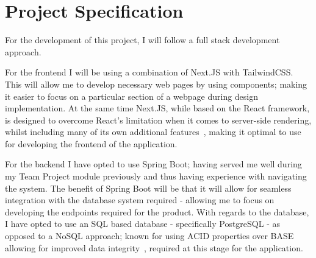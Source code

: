 \documentclass[]{final_report}
\begin{document}
\begin{abstract}
This can be achieved by adopting a points system similar to Picarats seen in the Professor Layton series~\cite{LAYTON} - where students will lose marks each time they fail to answer a question correctly until a set minimum. My intention with this system is that students are encouraged to try their hardest to answer correctly in their initial attempt, in order for them to score maximum marks - enabling their competitive spirit when comparing against others. This can be enhanced by hosting regular contests similarly to websites such as LeetCode~\cite{LEETCODE}, who host weekly and biweekly contests for their users to compete in for a similar purpose. Of course, there will also be some students who may be anxious at the idea that their performance would be public for all to see - for which this competitive feature can be optional for students to participate in. 

Teachers will also have access to this system if they wish to monitor the progress of their class. In this scenario all students statistics will be made available to them, allowing the teacher to gain an insight into the performance of their class, as well as host their own contests if they wish to. This way, everyone in the education sector can have a role in this application - allowing students to have support from all possible avenues in their studies.

\end{abstract}
\newpage



\section*{Project Specification}

For the development of this project, I will follow a full stack development approach.

For the frontend I will be using a combination of Next.JS with TailwindCSS. This will allow me to develop necessary web pages by using components; making it easier to focus on a particular section of a webpage during design implementation. At the same time Next.JS, while based on the React framework, is designed to overcome React's limitation when it comes to server-side rendering, whilst including many of its own additional features~\cite{DB_NEXTJS}, making it optimal to use for developing the frontend of the application.

For the backend I have opted to use Spring Boot; having served me well during my Team Project module previously and thus having experience with navigating the system. The benefit of Spring Boot will be that it will allow for seamless integration with the database system required - allowing me to focus on developing the endpoints required for the product. With regards to the database, I have opted to use an SQL based database - specifically PostgreSQL - as opposed to a NoSQL approach; known for using ACID properties over BASE allowing for improved data integrity~\cite{SQL}, required at this stage for the application.
\end{document}
